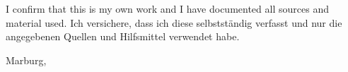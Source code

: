 \thispagestyle{empty}
\vspace*{0.8\textheight}
\noindent
\makeatletter
{}
{I confirm that this \MakeLowercase{\thesistype} is my own work and I have documented all sources and material used.}
{Ich versichere, dass ich diese \thesistype selbstständig verfasst und nur die angegebenen Quellen und Hilfsmittel verwendet habe.}
\makeatother

\vspace{15mm}
\noindent
Marburg, \submissiondate \hfill \student

\cleardoublepage{}